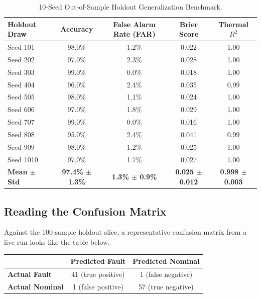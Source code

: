 \documentclass[11pt]{article}
\begin{document}
\begin{table}[h!]
\centering
\small
\begin{tabular}{lcccc}
\toprule
\textbf{Holdout Draw} & \textbf{Accuracy} & \textbf{False Alarm Rate (FAR)} & \textbf{Brier Score} & \textbf{Thermal $R^2$} \\
\midrule
Seed 101 & 98.0\% & 1.2\% & 0.022 & 1.00 \\
Seed 202 & 97.0\% & 2.3\% & 0.028 & 1.00 \\
Seed 303 & 99.0\% & 0.0\% & 0.018 & 1.00 \\
Seed 404 & 96.0\% & 2.4\% & 0.035 & 0.99 \\
Seed 505 & 98.0\% & 1.1\% & 0.024 & 1.00 \\
Seed 606 & 97.0\% & 1.8\% & 0.029 & 1.00 \\
Seed 707 & 99.0\% & 0.0\% & 0.016 & 1.00 \\
Seed 808 & 95.0\% & 2.4\% & 0.041 & 0.99 \\
Seed 909 & 98.0\% & 1.2\% & 0.025 & 1.00 \\
Seed 1010 & 97.0\% & 1.7\% & 0.027 & 1.00 \\
\midrule
\textbf{Mean $\pm$ Std} & \textbf{97.4\% $\pm$ 1.3\%} & \textbf{1.3\% $\pm$ 0.9\%} & \textbf{0.025 $\pm$ 0.012} & \textbf{0.998 $\pm$ 0.003} \\
\bottomrule
\end{tabular}
\caption{10-Seed Out-of-Sample Holdout Generalization Benchmark.}
\end{table}

\subsection{Reading the Confusion Matrix}

Against the 100-sample holdout slice, a representative confusion matrix from a live run looks like the table below.

\begin{center}
\small
\begin{tabular}{lcc}
\toprule
 & \textbf{Predicted Fault} & \textbf{Predicted Nominal} \\
\midrule
\textbf{Actual Fault} & 41 (true positive) & 1 (false negative) \\
\textbf{Actual Nominal} & 1 (false positive) & 57 (true negative) \\
\bottomrule
\end{tabular}
\end{center}
\end{document}

